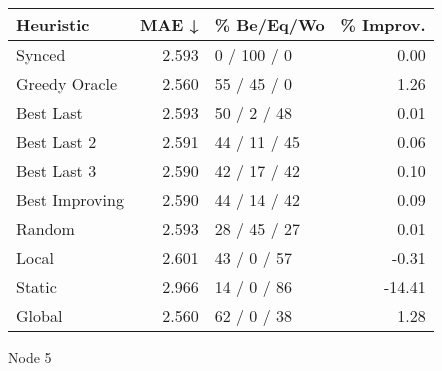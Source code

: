 \begin{tabular}{lrlr}
\toprule
\textbf{Heuristic} & \textbf{MAE ↓} & \textbf{\% Be/Eq/Wo} & \textbf{\% Improv.} \\
\midrule
            Synced &          2.593 &          0 / 100 / 0 &                0.00 \\
     Greedy Oracle &          2.560 &          55 / 45 / 0 &                1.26 \\
         Best Last &          2.593 &          50 / 2 / 48 &                0.01 \\
       Best Last 2 &          2.591 &         44 / 11 / 45 &                0.06 \\
       Best Last 3 &          2.590 &         42 / 17 / 42 &                0.10 \\
    Best Improving &          2.590 &         44 / 14 / 42 &                0.09 \\
            Random &          2.593 &         28 / 45 / 27 &                0.01 \\
             Local &          2.601 &          43 / 0 / 57 &               -0.31 \\
            Static &          2.966 &          14 / 0 / 86 &              -14.41 \\
            Global &          2.560 &          62 / 0 / 38 &                1.28 \\
\bottomrule
\end{tabular}
\caption{Node 5}
\label{tab:hr_iid_lr01_le1_bs4_5}
